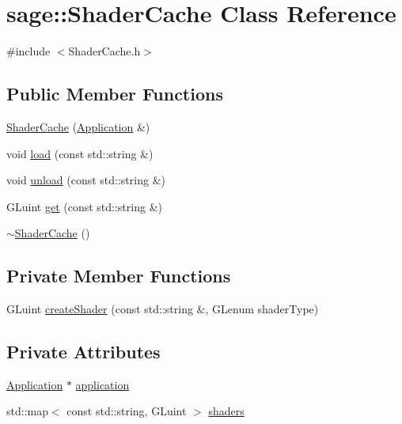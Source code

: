 \hypertarget{classsage_1_1ShaderCache}{}\section{sage\+::Shader\+Cache Class Reference}
\label{classsage_1_1ShaderCache}


{\ttfamily \#include $<$Shader\+Cache.\+h$>$}

\subsection*{Public Member Functions}
\begin{DoxyCompactItemize}
\item 
\mbox{\hyperlink{classsage_1_1ShaderCache_a0e06bd6fc1ffcc7129e13c8a3ae06aef}{Shader\+Cache}} (\mbox{\hyperlink{classsage_1_1Application}{Application}} \&)
\item 
void \mbox{\hyperlink{classsage_1_1ShaderCache_a3354d3c69b77ef0f1221ef8a0571826b}{load}} (const std\+::string \&)
\item 
void \mbox{\hyperlink{classsage_1_1ShaderCache_ab305b4c76870619524a6236899327ad6}{unload}} (const std\+::string \&)
\item 
G\+Luint \mbox{\hyperlink{classsage_1_1ShaderCache_aafc93b46c5a0416653424ee0b60b8aae}{get}} (const std\+::string \&)
\item 
\mbox{\hyperlink{classsage_1_1ShaderCache_a060caa88a1718dddc0800aa552ac4a41}{$\sim$\+Shader\+Cache}} ()
\end{DoxyCompactItemize}
\subsection*{Private Member Functions}
\begin{DoxyCompactItemize}
\item 
G\+Luint \mbox{\hyperlink{classsage_1_1ShaderCache_a6faed61c708a429ddb246855707c8596}{create\+Shader}} (const std\+::string \&, G\+Lenum shader\+Type)
\end{DoxyCompactItemize}
\subsection*{Private Attributes}
\begin{DoxyCompactItemize}
\item 
\mbox{\hyperlink{classsage_1_1Application}{Application}} $\ast$ \mbox{\hyperlink{classsage_1_1ShaderCache_ad640037115d2f37992b908a3bafcea7b}{application}}
\item 
std\+::map$<$ const std\+::string, G\+Luint $>$ \mbox{\hyperlink{classsage_1_1ShaderCache_a194bb7e1c8d2304d251cdeb52d8530df}{shaders}}
\end{DoxyCompactItemize}


